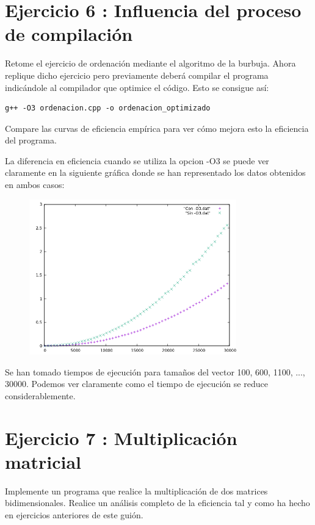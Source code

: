 \documentclass{article}
\begin{document}
\section{Ejercicio 6 : Influencia del proceso de compilación}
Retome el ejercicio de ordenación mediante el algoritmo de la burbuja. Ahora replique
dicho ejercicio pero previamente deberá compilar el programa indicándole al compilador
que optimice el código. Esto se consigue así:
\begin{verbatim}
g++ -O3 ordenacion.cpp -o ordenacion_optimizado
\end{verbatim}
Compare las curvas de eficiencia empírica para ver cómo mejora esto la eficiencia del programa.
\vspace{10mm}

La diferencia en eficiencia cuando se utiliza la opcion -O3 se puede ver claramente en la siguiente gráfica donde se han representado los datos obtenidos en ambos casos: 
\begin{figure}[H]
  \caption{}
  \centering
  \includegraphics[width=0.8\textwidth]{comparacion.png}
\end{figure}
Se han tomado tiempos de ejecución para tamaños del vector 100, 600, 1100, ..., 30000. Podemos ver claramente como el tiempo de ejecución se reduce considerablemente.
\clearpage
\section{Ejercicio 7 : Multiplicación matricial}
Implemente un programa que realice la multiplicación de dos matrices bidimensionales.
Realice un análisis completo de la eficiencia tal y como ha hecho en ejercicios anteriores de este guión.
\clearpage
\end{document}
